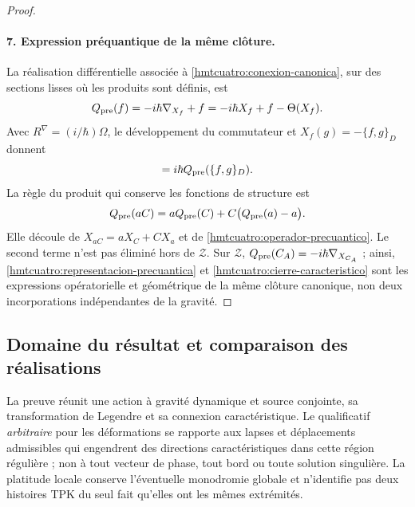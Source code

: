 \begin{proof}
\paragraph{7. Expression préquantique de la même clôture.}
La réalisation différentielle associée à \eqref{hmtcuatro:conexion-canonica}, sur des sections lisses où les produits sont définis, est
\begin{equation}
 Q_{\rm pre}(f)=-i\hbar\nabla_{X_f}+f
            =-i\hbar X_f+f-\Theta(X_f).
 \label{hmtcuatro:operador-precuantico}
\end{equation}
Avec \(R^\nabla=(i/\hbar)\Omega\), le développement du commutateur et \(X_f(g)=-\{f,g\}_D\) donnent
\begin{equation}
 [Q_{\rm pre}(f),Q_{\rm pre}(g)]
           =i\hbar Q_{\rm pre}(\{f,g\}_D).
 \label{hmtcuatro:representacion-precuantica}
\end{equation}
La règle du produit qui conserve les fonctions de structure est
\begin{equation}
 Q_{\rm pre}(aC)
   =aQ_{\rm pre}(C)+C\bigl(Q_{\rm pre}(a)-a\bigr).
 \label{hmtcuatro:funciones-estructura}
\end{equation}
Elle découle de \(X_{aC}=aX_C+CX_a\) et de \eqref{hmtcuatro:operador-precuantico}. Le second terme n’est pas éliminé hors de \(\mathcal Z\). Sur \(\mathcal Z\), \(Q_{\rm pre}(C_A)=-i\hbar\nabla_{X_{C_A}}\) ; ainsi, \eqref{hmtcuatro:representacion-precuantica} et \eqref{hmtcuatro:cierre-caracteristico} sont les expressions opératorielle et géométrique de la même clôture canonique, non deux incorporations indépendantes de la gravité.
\end{proof}

\subsection{Domaine du résultat et comparaison des réalisations}
\label{hmtcuatro:alcance-canonico}

La preuve réunit une action à gravité dynamique et source conjointe, sa transformation de Legendre et sa connexion caractéristique. Le qualificatif \emph{arbitraire} pour les déformations se rapporte aux lapses et déplacements admissibles qui engendrent des directions caractéristiques dans cette région régulière ; non à tout vecteur de phase, tout bord ou toute solution singulière. La platitude locale conserve l’éventuelle monodromie globale et n’identifie pas deux histoires TPK du seul fait qu’elles ont les mêmes extrémités.

